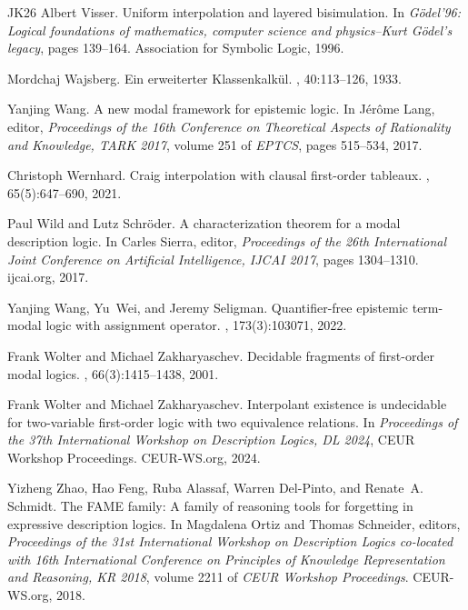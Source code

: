 \documentclass[10pt,a4paper]{amsart}
\theoremstyle{plain}
\theoremstyle{definition}
\begin{document}
\begin{thebibliography}{{}JK{\etalchar{+}}26}
Albert Visser.
\newblock Uniform interpolation and layered bisimulation.
\newblock In {\em G\"{o}del'96: Logical foundations of mathematics, computer science and physics--Kurt G\"{o}del's legacy}, pages 139--164. Association for Symbolic Logic, 1996.

Mordchaj Wajsberg.
\newblock Ein erweiterter {K}lassenkalk{\"u}l.
, 40:113--126, 1933.

Yanjing Wang.
\newblock A new modal framework for epistemic logic.
\newblock In J{\'{e}}r{\^{o}}me Lang, editor, {\em Proceedings of the 16th Conference on Theoretical Aspects of Rationality and Knowledge, {TARK} 2017}, volume 251 of {\em {EPTCS}}, pages 515--534, 2017.

Christoph Wernhard.
\newblock Craig interpolation with clausal first-order tableaux.
, 65(5):647--690, 2021.

Paul Wild and Lutz Schr{\"{o}}der.
\newblock A characterization theorem for a modal description logic.
\newblock In Carles Sierra, editor, {\em Proceedings of the 26th International Joint Conference on Artificial Intelligence, {IJCAI} 2017}, pages 1304--1310. ijcai.org, 2017.

Yanjing Wang, Yu~Wei, and Jeremy Seligman.
\newblock Quantifier-free epistemic term-modal logic with assignment operator.
, 173(3):103071, 2022.

Frank Wolter and Michael Zakharyaschev.
\newblock Decidable fragments of first-order modal logics.
, 66(3):1415--1438, 2001.

Frank Wolter and Michael Zakharyaschev.
\newblock Interpolant existence is undecidable for two-variable first-order logic with two equivalence relations.
\newblock In {\em Proceedings of the 37th International Workshop on Description Logics, DL 2024}, {CEUR} Workshop Proceedings. CEUR-WS.org, 2024.

Yizheng Zhao, Hao Feng, Ruba Alassaf, Warren Del{-}Pinto, and Renate~A. Schmidt.
\newblock The {FAME} family: {A} family of reasoning tools for forgetting in expressive description logics.
\newblock In Magdalena Ortiz and Thomas Schneider, editors, {\em Proceedings of the 31st International Workshop on Description Logics co-located with 16th International Conference on Principles of Knowledge Representation and Reasoning, {KR} 2018}, volume 2211 of {\em {CEUR} Workshop Proceedings}. CEUR-WS.org, 2018.


\end{thebibliography}
\end{document}
